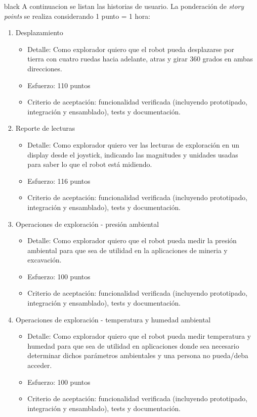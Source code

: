 \documentclass[
11pt, %
]{charter}
\begin{document}
\begin{consigna}{black}
A continuacion se listan las historias de usuario. La ponderación de \textit{story points} se realiza considerando 1 punto = 1 hora:

\begin{enumerate}
	\item Desplazamiento
	\begin{itemize}
		\item Detalle: Como explorador quiero que el robot pueda desplazarse por tierra con cuatro ruedas hacia adelante, atras y girar 360 grados en ambas direcciones.
		\item Esfuerzo: 110 puntos
		\item Criterio de aceptación: funcionalidad verificada (incluyendo prototipado, integración y ensamblado), tests y documentación.
	\end{itemize}
	
	\item Reporte de lecturas
	\begin{itemize}
		\item Detalle: Como explorador quiero ver las lecturas de exploración en un display desde el joystick, indicando las magnitudes y unidades usadas para saber lo que el robot está midiendo.
		\item Esfuerzo: 116 puntos		
		\item Criterio de aceptación: funcionalidad verificada (incluyendo prototipado, integración y ensamblado), tests y documentación.
	\end{itemize}
	
	\item Operaciones de exploración - presión ambiental
	\begin{itemize}
		\item Detalle: Como explorador quiero que el robot pueda medir la presión ambiental para que sea de utilidad en la aplicaciones de mineria y excavación.
		\item Esfuerzo: 100 puntos		
		\item Criterio de aceptación: funcionalidad verificada (incluyendo prototipado, integración y ensamblado), tests y documentación.
	\end{itemize}

	\item Operaciones de exploración - temperatura y humedad ambiental
	\begin{itemize}
		\item Detalle: Como explorador quiero que el robot pueda medir temperatura y humedad para que sea de utilidad en aplicaciones donde sea necesario determinar dichos parámetros ambientales y una persona no pueda/deba acceder.
		\item Esfuerzo: 100 puntos		
		\item Criterio de aceptación: funcionalidad verificada (incluyendo prototipado, integración y ensamblado), tests y documentación.
	\end{itemize}


\end{enumerate}
\end{consigna}
\end{document}
